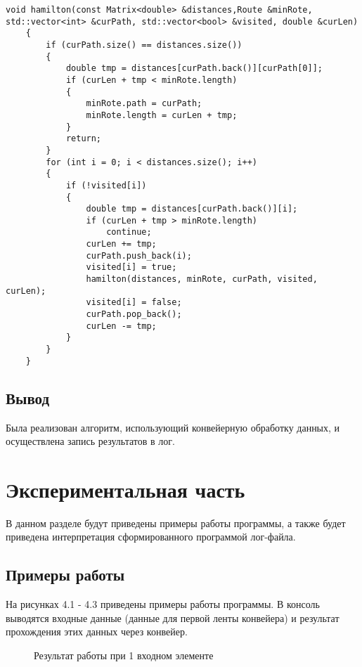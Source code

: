 \documentclass[a4paper,12pt]{report}
\begin{document}
\begin{lstlisting}[caption=Рекурсивная функция алгоритма полного перебора]
    void hamilton(const Matrix<double> &distances,Route &minRote, std::vector<int> &curPath, std::vector<bool> &visited, double &curLen)
    {
        if (curPath.size() == distances.size())
        {
            double tmp = distances[curPath.back()][curPath[0]];
            if (curLen + tmp < minRote.length)
            {
                minRote.path = curPath;
                minRote.length = curLen + tmp;
            }
            return;
        }
        for (int i = 0; i < distances.size(); i++)
        {
            if (!visited[i])
            {
                double tmp = distances[curPath.back()][i];
                if (curLen + tmp > minRote.length)
                    continue;
                curLen += tmp;
                curPath.push_back(i);
                visited[i] = true;
                hamilton(distances, minRote, curPath, visited, curLen);
                visited[i] = false;
                curPath.pop_back();
                curLen -= tmp;
            }
        }
    }
\end{lstlisting}

\section{Вывод}
Была реализован алгоритм, использующий конвейерную обработку данных, и осуществлена запись результатов в лог.

\chapter{Экспериментальная часть}
\hspace{0.6cm}В данном разделе будут приведены примеры работы программы, а также будет приведена интерпретация сформированного программой лог-файла.
\section{Примеры работы}
\hspace{0.6cm}На рисунках 4.1 - 4.3 приведены примеры работы программы. В консоль выводятся входные данные (данные для первой ленты конвейера) и результат прохождения этих данных через конвейер.
\begin{figure}[ht!]
\caption{Результат работы при 1 входном элементе}
\end{figure}
\end{document}
